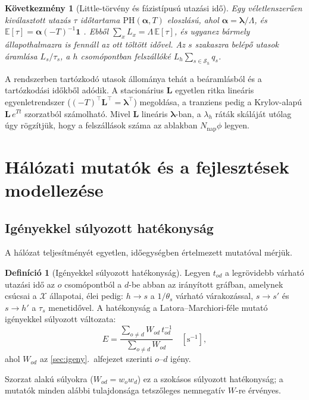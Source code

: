 \documentclass[12pt,a4paper]{article}
\newtheorem{kovetkezmeny}[tetel]{Következmény}
\theoremstyle{definition}
\newtheorem{definicio}[tetel]{Definíció}
\theoremstyle{remark}
\newcommand{\E}{\mathbb{E}}
\newcommand{\one}{\mathbf{1}}
\newcommand{\Ss}{\mathcal{S}}
\newcommand{\Xs}{\mathcal{X}}
\begin{document}
\begin{kovetkezmeny}[Little-törvény és fázistípusú utazási idő]
\label{kov:little}
Egy véletlenszerűen kiválasztott utazás $\tau$ időtartama
$\mathrm{PH}(\bm\alpha,T)$ eloszlású, ahol $\bm\alpha=\bm\lambda/\Lambda$, és
$\E[\tau]=\bm\alpha(-T)^{-1}\one$ \citep{neuts1981}. Ebből
$\sum_xL_x=\Lambda\,\E[\tau]$, és ugyanez bármely állapothalmazra is
fennáll az ott töltött idővel. Az $s$ szakaszra belépő utasok áramlása
$L_s/\tau_s$, a $h$ csomópontban felszállóké $L_h\sum_{s\in\Ss_h}q_s$.
\end{kovetkezmeny}

A rendszerben tartózkodó utasok állománya tehát a beáramlásból és a
tartózkodási időkből adódik. A stacionárius $\bm L$ egyetlen ritka lineáris
egyenletrendszer ($(-T)^\top\bm L^\top=\bm\lambda^\top$) megoldása, a
tranziens pedig a Krylov-alapú $\bm L\,e^{Tt}$ szorzatból számolható. Mivel
$\bm L$ lineáris $\bm\lambda$-ban, a $\lambda_h$ ráták skáláját utólag úgy
rögzítjük, hogy a felszállások száma az ablakban $N_{\mathrm{nap}}\phi$ legyen.

\section{Hálózati mutatók és a fejlesztések modellezése}
\label{sec:halozat}

\subsection{Igényekkel súlyozott hatékonyság}

A hálózat teljesítményét egyetlen, időegységben értelmezett mutatóval
mérjük.

\begin{definicio}[Igényekkel súlyozott hatékonyság]
Legyen $t_{od}$ a legrövidebb várható utazási idő az $o$ csomópontból a
$d$-be abban az irányított gráfban, amelynek csúcsai a $\Xs$ állapotai, élei
pedig: $h\to s$ a $1/\theta_s$ várható várakozással, $s\to s'$ és $s\to h'$
a $\tau_s$ menetidővel. A hatékonyság a Latora--Marchiori-féle mutató
\citep{latora2001} igényekkel súlyozott változata:
\[
  E=\frac{\sum_{o\ne d}W_{od}\,t_{od}^{-1}}{\sum_{o\ne d}W_{od}}
  \quad[\mathrm s^{-1}],
\]
ahol $W_{od}$ az \ref{sec:igeny}.~alfejezet szerinti $o$--$d$ igény.
\end{definicio}

Szorzat alakú súlyokra ($W_{od}=w_ow_d$) ez a szokásos súlyozott
hatékonyság; a mutatók minden alábbi tulajdonsága tetszőleges nemnegatív
$W$-re érvényes.
\end{document}
